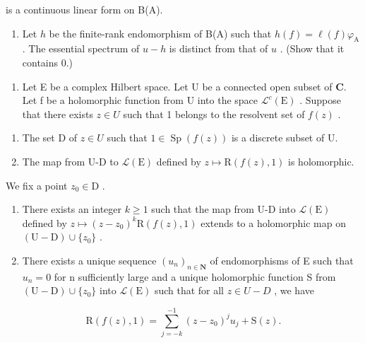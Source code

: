 is a continuous linear form on B(A).

\begin{enumerate}
\def\labelenumi{\alph{enumi})}
\setcounter{enumi}{1}
\tightlist
\item
  Let \(h\) be the finite-rank endomorphism of B(A) such that \(h(f) = \ell(f)\varphi_{\mathrm{A}}\) . The essential spectrum of \(u - h\) is distinct from that of \(u\) . (Show that it contains 0.)
\end{enumerate}

\begin{enumerate}
\def\labelenumi{\arabic{enumi})}
\setcounter{enumi}{2}
\tightlist
\item
  Let E be a complex Hilbert space. Let U be a connected open subset of \(\mathbf{C}\). Let f be a holomorphic function from U into the space \(\mathcal{L}^{c}(\mathrm{E})\) . Suppose that there exists \(z \in U\) such that 1 belongs to the resolvent set of \(f(z)\) .
\end{enumerate}

\begin{enumerate}
\def\labelenumi{\alph{enumi})}
\item
  The set D of \(z \in U\) such that \(1 \in \operatorname{Sp}(f(z))\) is a discrete subset of U.
\item
  The map from U-D to \(\mathcal{L}(\mathrm{E})\) defined by \(z\mapsto \mathrm{R}(f(z),1)\) is holomorphic.
\end{enumerate}

We fix a point \(z_0 \in \mathrm{D}\) .

\begin{enumerate}
\def\labelenumi{\alph{enumi})}
\setcounter{enumi}{2}
\item
  There exists an integer \(k \geqslant 1\) such that the map from U-D into \(\mathcal{L}(\mathrm{E})\) defined by \(z \mapsto (z - z_{0})^{k}\mathrm{R}(f(z), 1)\) extends to a holomorphic map on \((\mathrm{U}-\mathrm{D}) \cup \{z_{0}\}\) .
\item
  There exists a unique sequence \((u_{n})_{n\in\mathbf{N}}\) of endomorphisms of E such that \(u_{n}=0\) for n sufficiently large and a unique holomorphic function S from \((\mathrm{U}-\mathrm{D})\cup\{z_{0}\}\) into \(\mathcal{L}(\mathrm{E})\) such that for all \(z\in U-D\) , we have
\end{enumerate}

\[
\mathrm{R} (f (z), 1) = \sum_ {j = - k} ^ {- 1} (z - z _ {0}) ^ {j} u _ {j} + \mathrm{S} (z).
\]

